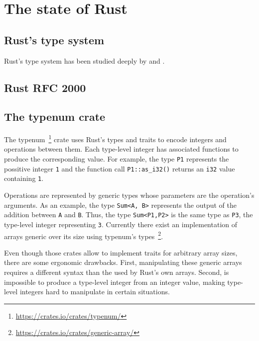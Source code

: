 \section{The state of Rust} 

\subsection{Rust's type system}
Rust's type system has been studied deeply by \citet{reed} and \citet{ralf}.
\subsection{Rust RFC 2000} 

\subsection{The typenum crate}

The typenum~\footnote{\url{https://crates.io/crates/typenum/}} crate uses Rust's
types and traits to encode integers and operations between them. Each type-level
integer has associated functions to produce the corresponding value. For
example, the type \texttt{P1} represents the possitive integer \texttt{1} and
the function call \texttt{P1::as\_i32()} returns an \texttt{i32} value
containing \texttt{1}. 

Operations are represented by generic types whose parameters are the operation's
arguments. As an example, the type \texttt{Sum<A, B>} represents the output of
the addition between \texttt{A} and \texttt{B}. Thus, the type
\texttt{Sum<P1,P2>} is the same type as \texttt{P3}, the type-level integer
representing \texttt{3}. Currently there exist an implementation of arrays
generic over its size using typenum's
types~\footnote{\url{https://crates.io/crates/generic-array/}}.

Even though those crates allow to implement traits for arbitrary array sizes,
there are some ergonomic drawbacks. First, manipulating these generic arrays requires a
different syntax than the used by Rust's own arrays. Second, is impossible to
produce a type-level integer from an integer value, making type-level integers
hard to manipulate in certain situations.
